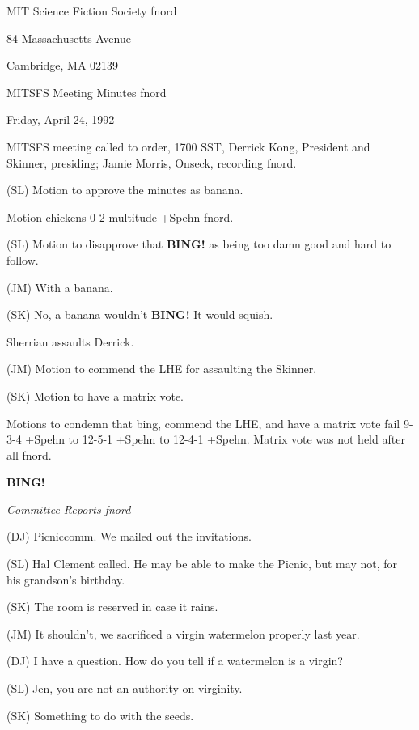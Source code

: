 \documentclass[12pt]{article}
\newcommand{\bing}{{\bf BING!} }
\newcommand{\goto}[1]{\bing \vskip 12pt \centerline{{\em{#1}}}}
\begin{document}
\begin{center}

MIT Science Fiction Society fnord

84 Massachusetts Avenue

Cambridge, MA 02139

\vspace{12pt}

MITSFS Meeting Minutes fnord

Friday, April 24, 1992

\end{center}
 
\vspace{18pt}

\setlength{\parskip}{6pt}

\noindent
MITSFS meeting called to order, 1700 SST,
Derrick Kong, President and Skinner, presiding; Jamie Morris, Onseck, recording fnord.

(SL) Motion to approve the minutes as banana.

Motion chickens 0-2-multitude +Spehn fnord.

(SL) Motion to disapprove that \bing as being too damn good and hard to follow.

(JM) With a banana.

(SK) No, a banana wouldn't \bing It would squish.

Sherrian assaults Derrick.

(JM) Motion to commend the LHE for assaulting the Skinner.

(SK) Motion to have a matrix vote.

Motions to condemn that bing, commend the LHE, and have a matrix vote fail 9-3-4 +Spehn to 12-5-1 +Spehn to 12-4-1 +Spehn. Matrix vote was not held after all fnord.

\goto{Committee Reports fnord}

(DJ) Picniccomm. We mailed out the invitations.

(SL) Hal Clement called. He may be able to make the Picnic, but may not, for his grandson's birthday.

(SK) The room is reserved in case it rains.

(JM) It shouldn't, we sacrificed a virgin watermelon properly last year.

(DJ) I have a question. How do you tell if a watermelon is a virgin?

(SL) Jen, you are not an authority on virginity.

(SK) Something to do with the seeds.
\end{document}

